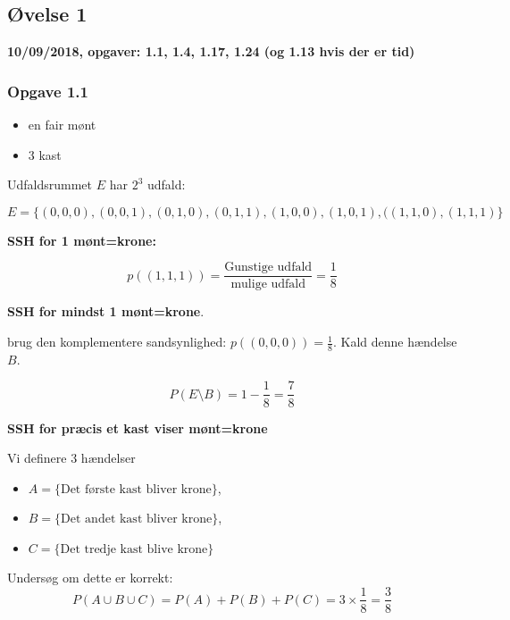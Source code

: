 \horizline

\subsection{Øvelse 1}

\textbf{10/09/2018, opgaver: 1.1, 1.4, 1.17, 1.24 (og 1.13 hvis der er tid)}

\subsubsection{Opgave 1.1}

\begin{itemize}
    \item en fair mønt
    \item 3 kast
\end{itemize}

Udfaldsrummet $E$ har $2^3$ udfald:

$E=\{(0,0,0),(0,0,1),(0,1,0),(0,1,1),(1,0,0),(1,0,1),((1,1,0),(1,1,1)\}$

\textbf{SSH for 1 mønt=krone:}

\begin{equation}
    p((1,1,1)) = \frac{\text{Gunstige udfald}}{\text{mulige udfald}} = \frac{1}{8}
\end{equation}

\textbf{SSH for mindst 1 mønt=krone}. \newline

brug den komplementere sandsynlighed: $p((0,0,0)) = \frac{1}{8}$. Kald denne hændelse $B$.

\begin{equation}
    P(E\setminus B) = 1 - \frac{1}{8} = \frac{7}{8}
\end{equation}

\textbf{SSH for præcis et kast viser mønt=krone}

Vi definere 3 hændelser

\begin{itemize}
    \item $A = \{ \text{Det første kast bliver krone}\}$, 
    \item $B = \{\text{Det andet kast bliver krone}\}$, 
    \item $C = \{\text{Det tredje kast blive krone}\}$
\end{itemize}

Undersøg om dette er korrekt:
\begin{equation}
    P(A \cup B \cup C) = P(A) + P(B) + P(C)  = 3\times \frac{1}{8} = \frac{3}{8}
\end{equation}

